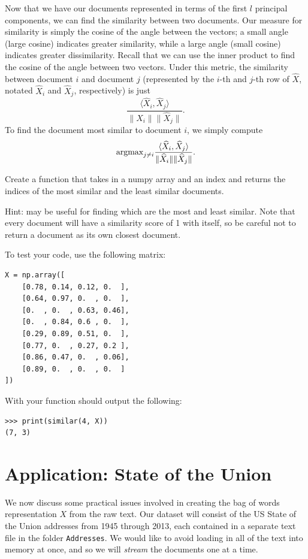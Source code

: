 Now that we have our documents represented in terms of the first $l$ principal components, we can find the similarity between two documents.
Our measure for similarity is simply the cosine of the angle between the vectors; a small angle (large cosine) indicates greater similarity, while a large angle (small cosine) indicates greater dissimilarity.
Recall that we can use the inner product to find the cosine of the angle between two vectors.
Under this metric, the similarity between document $i$ and document $j$ (represented by the $i$-th and $j$-th row of $\widehat{X}$, notated $\widehat{X}_i$ and $\widehat{X}_j$, respectively) is just
\[
\frac{\langle \widehat{X}_i, \widehat{X}_j\rangle}{\|\widehat{X}_i\|\|\widehat{X}_j\|}.
\]
To find the document most similar to document $i$, we simply compute
\[
\mbox{argmax}_{j\neq i} \frac{\langle \widehat{X}_i, \widehat{X}_j\rangle}{\|\widehat{X}_i\|\|\widehat{X}_j\|}.
\]

\begin{problem} %
Create a function  that takes in a numpy array  and an index  and returns the indices of the most similar and the least similar documents.

Hint:  may be useful for finding which are the most and least similar.
Note that every document will have a similarity score of 1 with itself, so be careful not to return a document as its own closest document.

To test your code, use the following matrix:
\begin{lstlisting}
X = np.array([
    [0.78, 0.14, 0.12, 0.  ],
    [0.64, 0.97, 0.  , 0.  ],
    [0.  , 0.  , 0.63, 0.46],
    [0.  , 0.84, 0.6 , 0.  ],
    [0.29, 0.89, 0.51, 0.  ],
    [0.77, 0.  , 0.27, 0.2 ],
    [0.86, 0.47, 0.  , 0.06],
    [0.89, 0.  , 0.  , 0.  ]
]) 
\end{lstlisting}
With  your function should output the following:
\begin{lstlisting}
>>> print(similar(4, X))
(7, 3)
\end{lstlisting}
\end{problem}

\section*{Application: State of the Union} 
We now discuss some practical issues involved in creating the bag of words representation $X$ from the raw text.
Our dataset will consist of the US State of the Union addresses from 1945 through 2013, each contained in a separate text file in the folder {\tt Addresses}.
We would like to avoid loading in all of the text into memory at once, and so we will \emph{stream} the documents one at a time.

